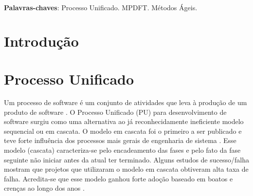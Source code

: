 \documentclass[
	article,			%
	11pt,				%
	oneside,			%
	a4paper,			%
	english,			%
	brazil,				%
	sumario=tradicional
	]{abntex2}
\begin{document}
\frenchspacing 


%
%
\maketitle

\begin{resumoumacoluna}
 \lipsum[1]
 
 \vspace{\onelineskip}
 
 \noindent
 \textbf{Palavras-chaves}: Processo Unificado. MPDFT. Métodos Ágeis.
\end{resumoumacoluna}


\textual

\section*{Introdução}

   \lipsum[1]

\section{Processo Unificado}

Um processo de software é um conjunto de atividades que leva à produção de um
produto de software \cite{sommerville2007}. O Processo Unificado (PU) para
desenvolvimento de software surgiu como uma alternativa ao já reconhecidamente
ineficiente modelo sequencial ou em cascata. O modelo em cascata foi o primeiro
a ser publicado e teve forte influência dos processos mais gerais de engenharia de
sistema \cite{sommerville2007}. Esse modelo (cascata) caracteriza-se pelo
encadeamento das fases e pelo fato da fase seguinte não iniciar antes da atual
ter terminado. Alguns estudos de sucesso/falha mostram que projetos que
utilizaram o modelo em cascata obtiveram alta taxa de falha. Acredita-se que
esse modelo ganhou forte adoção baseado em boatos e crenças ao longo dos anos
\cite{larman2007utilizando}.
\end{document}

